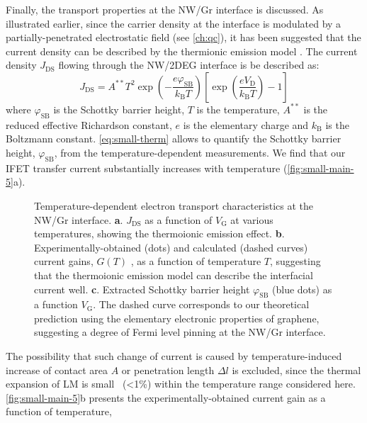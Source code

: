 Finally, the transport properties at the NW/Gr interface is
discussed. As illustrated earlier, since the carrier density at the
interface is modulated by a partially-penetrated electrostatic field
(see \autoref{ch:qc}), it has been suggested that the current density
can be described by the thermionic emission model
\autocite{Sze_2006_Mosfets}.
%
The current density $J_{\mathrm{DS}}$ flowing
through the NW/2DEG interface is be described as:
\begin{equation}
\label{eq:small-therm}
J_{\mathrm{DS}} = A^{**} T^{2} \exp(- \frac{e \varphi_{\mathrm{SB}}}{k_{\mathrm{B}}T}) 
                \left[ \exp(\frac{e V_{\mathrm{D}}}{k_{\mathrm{B}}T}) - 1\right]
\end{equation}
where $\varphi_{\mathrm{SB}}$ is the Schottky barrier height, \(T\) is the temperature, \(A^{**}\) is the reduced effective
Richardson constant, \(e\) is the elementary charge and \(k_{\mathrm{B}}\) is the Boltzmann
constant. 
%
\autoref{eq:small-therm} allows to quantify the Schottky barrier
height, \(\varphi_{\mathrm{SB}}\), from the temperature-dependent
measurements. We find that our IFET transfer current substantially
increases with temperature (\autoref{fig:small-main-5}a).
%
\begin{figure}[!htbp]
\centering
{}
\caption{\label{fig:small-main-5} Temperature-dependent electron
  transport characteristics at the NW/Gr interface. \textbf{a}.
  \(J_{\mathrm{DS}}\) as a function of \(V_{\mathrm{G}}\) at various
  temperatures, showing the thermoionic emission effect. \textbf{b}.
  Experimentally-obtained (dots) and calculated (dashed curves)
  current gains, \(G(T)\) , as a function of temperature \(T\),
  suggesting that the thermoionic emission model can describe the
  interfacial current well. \textbf{c}. Extracted Schottky barrier
  height \(\varphi_{\mathrm{SB}}\) (blue dots) as a function
  \(V_{\mathrm{G}}\). The dashed curve corresponds to our theoretical
  prediction using the elementary electronic properties of graphene,
  suggesting a degree of Fermi level pinning at the NW/Gr interface.}
\end{figure}
%
The possibility that such change of current is caused by
temperature-induced increase of contact area $A$ or penetration length
$\Delta l$ is excluded, since the thermal expansion of LM is
small~\autocite{Dickey_2008_EGAIN} (\textless{}1\%) within the temperature
range considered here.
%
\autoref{fig:small-main-5}b presents the experimentally-obtained
current gain as a function of temperature,
